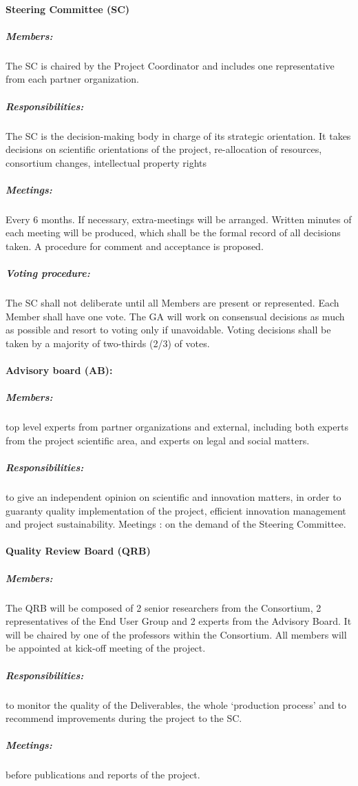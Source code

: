 \paragraph{Steering Committee (SC)}

\subparagraph{Members:} The SC is chaired by the Project Coordinator
and includes one representative from each partner organization.

\subparagraph{Responsibilities:} The SC is the decision-making body in
charge of its strategic orientation.  It takes decisions on scientific
orientations of the project, re-allocation of resources, consortium
changes, intellectual property rights

\subparagraph{Meetings:} Every 6 months. If necessary, extra-meetings
will be arranged.  Written minutes of each meeting will be produced,
which shall be the formal record of all decisions taken. A procedure
for comment and acceptance is proposed.

\subparagraph{Voting procedure:} The SC shall not deliberate until all
Members are present or represented.  Each Member shall have one
vote. The GA will work on consensual decisions as much as possible and
resort to voting only if unavoidable. Voting decisions shall be taken
by a majority of two-thirds (2/3) of votes.

\paragraph{Advisory board (AB):}

\subparagraph{Members:} top level experts from partner organizations
and external, including both experts from the project scientific area,
and experts on legal and social matters.

\subparagraph{Responsibilities:} to give an independent opinion on
scientific and innovation matters, in order to guaranty quality
implementation of the project, efficient innovation management and
project sustainability.  Meetings : on the demand of the Steering
Committee.

\paragraph{Quality Review Board (QRB)}
\subparagraph{Members:} The QRB will be composed of 2 senior
researchers from the Consortium, 2 representatives of the End User
Group and 2 experts from the Advisory Board. It will be chaired by one
of the professors within the Consortium. All members will be appointed
at kick-off meeting of the project.  
\subparagraph{Responsibilities:}
to monitor the quality of the Deliverables, the whole ‘production
process’ and to recommend improvements during the project to the SC.
\subparagraph{Meetings:} before publications and reports of the
project.

